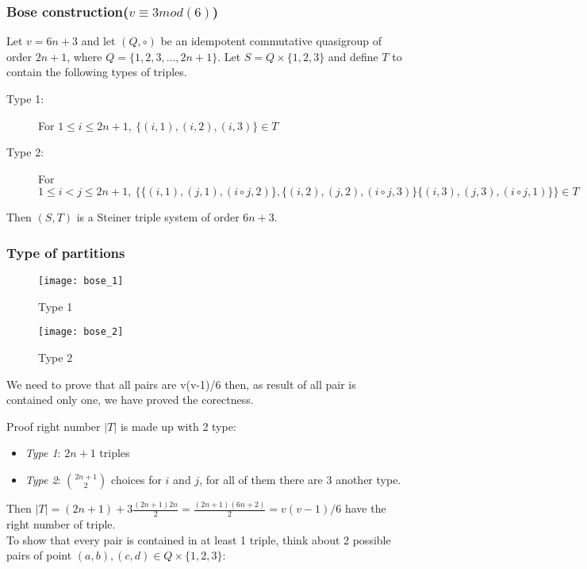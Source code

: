 \begin{frame}
\frametitle{Bose construction($v \equiv 3 mod(6)$)} 
Let $v = 6n +3$ and let $(Q,\circ)$ be an idempotent commutative quasigroup of order $2n+1$, where $Q = \{1,2,3,...,2n+1\}$. Let $S= Q \times \{1,2,3\}$ and define $T$ to contain the following types of triples.
\begin{description}
	\item[Type 1:] For $1 \le i \le 2n +1, \ \{(i,1),(i,2),(i,3)\} \in T$ 
	\item[Type 2:] For $1 \le i < j \le 2n +1, \ \{ \{ (i,1),(j,1),(i \circ j,2)\},\{ (i,2),(j,2),(i \circ j,3)\}\{ (i,3),(j,3),(i \circ j,1)\}\} \in T$
\end{description}

Then $(S,T)$ is a Steiner triple system of order $6n + 3$.

\end{frame}

\begin{frame}
\frametitle{Type of partitions}
\begin{figure}
	\texttt{[image: bose\_1]}
	\caption{Type 1}
\end{figure}
\begin{figure}
	\texttt{[image: bose\_2]}
	\caption{Type 2}
\end{figure}
\end{frame}


\begin{comment}
If we are considering a set of v(v-1)/6 triples of 
elements of a v-set and know that each pair elements is 
contained in at least one triple, then each pair must be 
contained in exactly one triple and we have an STS(v). 
Therefore we need only count the number of triples and verify 
that each pair of elements is contained in a triple in order to 
show that a system is an STS.
\end{comment}
\begin{frame}
We need to prove that all pairs are v(v-1)/6 then, as result of all pair is contained only one, we have proved the corectness.

\begin{block}{Proof right number}
$|T|$ is made up with 2 type:\begin{itemize}
	\item \textit{Type 1}: $2n+1$ triples
	\item \textit{Type 2}: $\binom{2n + 1}{2}$ choices for $i$ and $j$, for all of them there are 3 another type.
\end{itemize} 
Then $|T| = (2n+1) + 3\frac{(2n+1)2n}{2} = \frac{(2n+1)(6n+2)}{2} = v(v-1)/6$ have the right number of triple.\\%

To show that every pair is contained in at least 1 triple, think about 2 possible pairs of point $(a,b),(c,d) \in Q \times \{1,2,3\}$:

\end{block}\end{frame}

